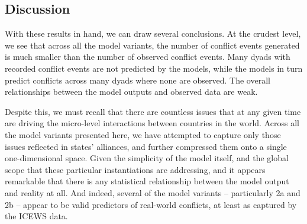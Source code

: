 
\subsection{Discussion}

With these results in hand, we can draw several conclusions. At the crudest level, we see that across all the model variants, the number of conflict events generated is much smaller than the number of observed conflict events. Many dyads with recorded conflict events are not predicted by the models, while the models in turn predict conflicts across many dyads where none are observed. The overall relationships between the model outputs and observed data are weak.

Despite this, we must recall that there are countless issues that at any given time are driving the micro-level interactions between countries in the world. Across all the model variants presented here, we have attempted to capture only those issues reflected in states' alliances, and further compressed them onto a single one-dimensional space. Given the simplicity of the model itself, and the global scope that these particular instantiations are addressing, and it appears remarkable that there is any statistical relationship between the model output and reality at all. And indeed, several of the model variants -- particularly 2a and 2b -- appear to be valid predictors of real-world conflicts, at least as captured by the ICEWS data.


